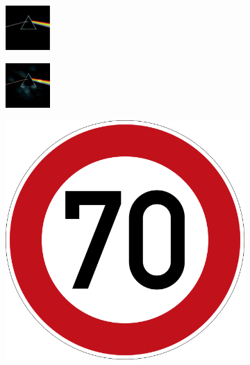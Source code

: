 \begin{figure}
\begin{subfigure}{.19\linewidth}
  \centering
  \includegraphics[width=0.7\linewidth]{imgs/darkside}
\end{subfigure}
\begin{subfigure}{.19\linewidth}
  \centering
  \includegraphics[width=0.7\linewidth]{imgs/7}
\end{subfigure}
\begin{subfigure}{.19\linewidth}
  \centering
  \includegraphics[width=0.7\linewidth]{imgs/7_real}
\end{subfigure}


\end{figure}
